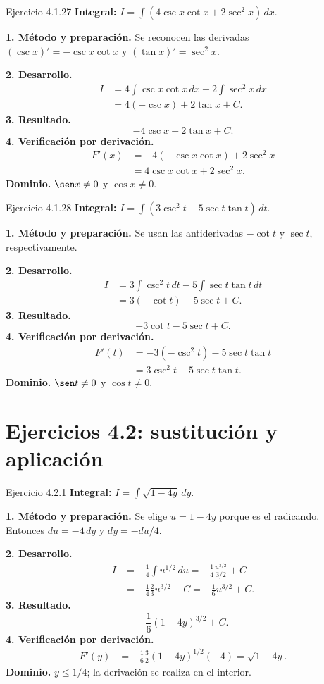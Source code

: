 \begin{examplebox}{Ejercicio 4.1.27}
\textbf{Integral:} $\displaystyle I=\int (4\csc x\cot x+2\sec^2x)\,dx$.

\textbf{1. Método y preparación.} Se reconocen las derivadas $(\csc x)'=-\csc x\cot x$ y $(\tan x)'=\sec^2x$.

\textbf{2. Desarrollo.}
\begin{align*}
I&=4\int\csc x\cot x\,dx+2\int\sec^2x\,dx\\&=4(-\csc x)+2\tan x+C.
\end{align*}
\textbf{3. Resultado.}
\[
-4\csc x+2\tan x+C.
\]
\textbf{4. Verificación por derivación.}
\begin{align*}
F'(x)&=-4(-\csc x\cot x)+2\sec^2x\\&=4\csc x\cot x+2\sec^2x.
\end{align*}
\textbf{Dominio.} $\sen x\ne0$ y $\cos x\ne0$.
\end{examplebox}

\begin{examplebox}{Ejercicio 4.1.28}
\textbf{Integral:} $\displaystyle I=\int (3\csc^2t-5\sec t\tan t)\,dt$.

\textbf{1. Método y preparación.} Se usan las antiderivadas $-\cot t$ y $\sec t$, respectivamente.

\textbf{2. Desarrollo.}
\begin{align*}
I&=3\int\csc^2t\,dt-5\int\sec t\tan t\,dt\\&=3(-\cot t)-5\sec t+C.
\end{align*}
\textbf{3. Resultado.}
\[
-3\cot t-5\sec t+C.
\]
\textbf{4. Verificación por derivación.}
\begin{align*}
F'(t)&=-3(-\csc^2t)-5\sec t\tan t\\&=3\csc^2t-5\sec t\tan t.
\end{align*}
\textbf{Dominio.} $\sen t\ne0$ y $\cos t\ne0$.
\end{examplebox}


\clearpage
\section{Ejercicios 4.2: sustitución y aplicación}

\begin{examplebox}{Ejercicio 4.2.1}
\textbf{Integral:} $\displaystyle I=\int \sqrt{1-4y}\,dy$.

\textbf{1. Método y preparación.} Se elige $u=1-4y$ porque es el radicando. Entonces $du=-4\,dy$ y $dy=-du/4$.

\textbf{2. Desarrollo.}
\begin{align*}
I&=-\frac14\int u^{1/2}\,du=-\frac14\frac{u^{3/2}}{3/2}+C\\&=-\frac14\frac23u^{3/2}+C=-\frac16u^{3/2}+C.
\end{align*}
\textbf{3. Resultado.}
\[
-\frac16(1-4y)^{3/2}+C.
\]
\textbf{4. Verificación por derivación.}
\begin{align*}
F'(y)&=-\frac16\frac32(1-4y)^{1/2}(-4)=\sqrt{1-4y}.
\end{align*}
\textbf{Dominio.} $y\le1/4$; la derivación se realiza en el interior.
\end{examplebox}

